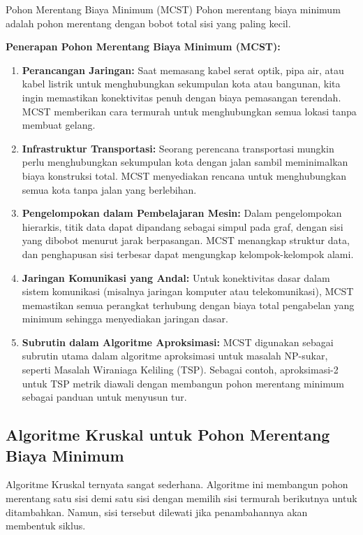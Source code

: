 \begin{definition}{Pohon Merentang Biaya Minimum (MCST)}
Pohon merentang biaya minimum adalah pohon merentang dengan bobot total sisi yang paling kecil.  
\end{definition}

\textbf{Penerapan Pohon Merentang Biaya Minimum (MCST):}
\begin{enumerate}
    \item \textbf{Perancangan Jaringan:} Saat memasang kabel serat optik, pipa air, atau kabel listrik untuk menghubungkan sekumpulan kota atau bangunan, kita ingin memastikan konektivitas penuh dengan biaya pemasangan terendah. MCST memberikan cara termurah untuk menghubungkan semua lokasi tanpa membuat gelang.

    \item \textbf{Infrastruktur Transportasi:} Seorang perencana transportasi mungkin perlu menghubungkan sekumpulan kota dengan jalan sambil meminimalkan biaya konstruksi total. MCST menyediakan rencana untuk menghubungkan semua kota tanpa jalan yang berlebihan.

    \item \textbf{Pengelompokan dalam Pembelajaran Mesin:} Dalam pengelompokan hierarkis, titik data dapat dipandang sebagai simpul pada graf, dengan sisi yang dibobot menurut jarak berpasangan. MCST menangkap struktur data, dan penghapusan sisi terbesar dapat mengungkap kelompok-kelompok alami.

    \item \textbf{Jaringan Komunikasi yang Andal:} Untuk konektivitas dasar dalam sistem komunikasi (misalnya jaringan komputer atau telekomunikasi), MCST memastikan semua perangkat terhubung dengan biaya total pengabelan yang minimum sehingga menyediakan jaringan dasar.

    \item \textbf{Subrutin dalam Algoritme Aproksimasi:} MCST digunakan sebagai subrutin utama dalam algoritme aproksimasi untuk masalah NP-sukar, seperti Masalah Wiraniaga Keliling (TSP). Sebagai contoh, aproksimasi-2 untuk TSP metrik diawali dengan membangun pohon merentang minimum sebagai panduan untuk menyusun tur.
\end{enumerate}

\subsection{Algoritme Kruskal untuk Pohon Merentang Biaya Minimum}
\label{subsec:gt-kruskal}
Algoritme Kruskal ternyata sangat sederhana.  Algoritme ini membangun pohon merentang satu sisi demi satu sisi dengan memilih sisi termurah berikutnya untuk ditambahkan.  Namun, sisi tersebut dilewati jika penambahannya akan membentuk siklus.

